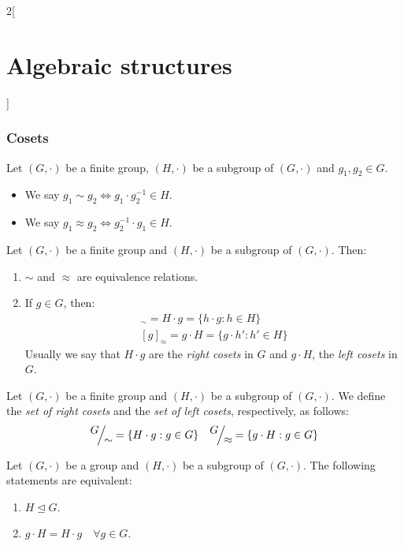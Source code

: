 \documentclass[../../../main_math.tex]{subfiles}
\begin{document}
\begin{multicols}{2}[\section{Algebraic structures}]
  \subsubsection{Cosets}
  \begin{definition}\label{AS_equiv}
    Let $(G,\cdot)$ be a finite group, $(H,\cdot)$ be a subgroup of $(G,\cdot)$ and $g_1,g_2\in G$.
    \begin{itemize}
      \item We say $g_1\sim g_2\iff g_1\cdot g_2^{-1}\in H$.
      \item We say $g_1\approx g_2\iff g_2^{-1}\cdot g_1\in H$.
    \end{itemize}
  \end{definition}
  \begin{lemma}
    Let $(G,\cdot)$ be a finite group and $(H,\cdot)$ be a subgroup of $(G,\cdot)$. Then:
    \begin{enumerate}
      \item $\sim$ and $\approx$ are equivalence relations.
      \item If $g\in G$, then:
            \begin{gather*}
              [g]_\sim=H\cdot g=\{h\cdot g:h\in H\}\\ [g]_\approx=g\cdot H=\{g\cdot h':h'\in H\}
            \end{gather*}
            Usually we say that $H\cdot g$ are the \emph{right cosets} in $G$ and $g\cdot H$, the \emph{left cosets} in $G$.
    \end{enumerate}
  \end{lemma}
  \begin{definition}
    Let $(G,\cdot)$ be a finite group and $(H,\cdot)$ be a subgroup of $(G,\cdot)$. We define the \emph{set of right cosets} and the \emph{set of left cosets}, respectively, as follows:
    $$\quot{G}{\sim}=\{H\cdot g:g\in G\}\quad\quot{G}{\approx}=\{g\cdot H:g\in G\}$$
  \end{definition}
  \begin{proposition}
    Let $(G,\cdot)$ be a group and $(H,\cdot)$ be a subgroup of $(G,\cdot)$. The following statements are equivalent:
    \begin{enumerate}
      \item $H\unlhd G$.
      \item $g\cdot H=H\cdot g\quad\forall g\in G$.
    \end{enumerate}
  \end{proposition}
  \begin{theorem}

\end{theorem}
\end{multicols}
\end{document}
